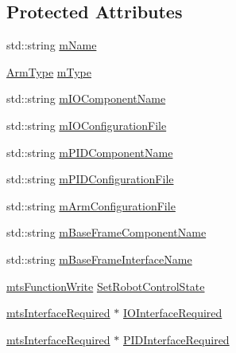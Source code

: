 \subsection*{Protected Attributes}
\begin{DoxyCompactItemize}
\item 
std\-::string \hyperlink{classmts_intuitive_research_kit_console_1_1_arm_a5693697a8b14ebd601b1d1ff18b22d94}{m\-Name}
\item 
\hyperlink{classmts_intuitive_research_kit_console_1_1_arm_acb898ba65d323f59ffd0885a47ef6cec}{Arm\-Type} \hyperlink{classmts_intuitive_research_kit_console_1_1_arm_a69835b5b055a66cd7d02ab5d784ae84b}{m\-Type}
\item 
std\-::string \hyperlink{classmts_intuitive_research_kit_console_1_1_arm_ac5010e0fdd71d2f87c123ef1931e3f62}{m\-I\-O\-Component\-Name}
\item 
std\-::string \hyperlink{classmts_intuitive_research_kit_console_1_1_arm_a14ea7da9b455d326f2458f4b27d062d0}{m\-I\-O\-Configuration\-File}
\item 
std\-::string \hyperlink{classmts_intuitive_research_kit_console_1_1_arm_a03dbe96c5a71a8ce46bb37177bf22351}{m\-P\-I\-D\-Component\-Name}
\item 
std\-::string \hyperlink{classmts_intuitive_research_kit_console_1_1_arm_a380c1811ecda360d324a14a3de57b4b8}{m\-P\-I\-D\-Configuration\-File}
\item 
std\-::string \hyperlink{classmts_intuitive_research_kit_console_1_1_arm_aa0d61e31bc02be631a22f052df1d7c69}{m\-Arm\-Configuration\-File}
\item 
std\-::string \hyperlink{classmts_intuitive_research_kit_console_1_1_arm_a35d468335ff2fee536eddd9e3d0a9d1b}{m\-Base\-Frame\-Component\-Name}
\item 
std\-::string \hyperlink{classmts_intuitive_research_kit_console_1_1_arm_a9f2009051bc0469b0ee4040e7d3aea87}{m\-Base\-Frame\-Interface\-Name}
\item 
\hyperlink{classmts_function_write}{mts\-Function\-Write} \hyperlink{classmts_intuitive_research_kit_console_1_1_arm_a84684b49b9b5a5773a6761d08086c9bf}{Set\-Robot\-Control\-State}
\item 
\hyperlink{classmts_interface_required}{mts\-Interface\-Required} $\ast$ \hyperlink{classmts_intuitive_research_kit_console_1_1_arm_ac1b5e758edf02d1bbc5ff98280473625}{I\-O\-Interface\-Required}
\item 
\hyperlink{classmts_interface_required}{mts\-Interface\-Required} $\ast$ \hyperlink{classmts_intuitive_research_kit_console_1_1_arm_ac309d27d555062d5e1cda632ed8f88cc}{P\-I\-D\-Interface\-Required}

\end{DoxyCompactItemize}
